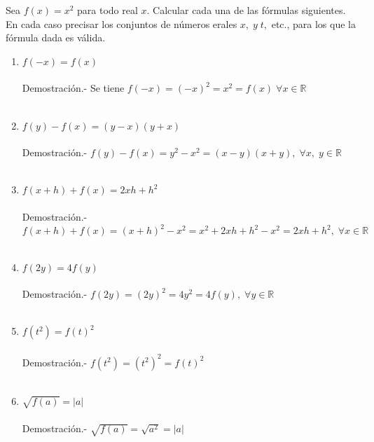 \begin{ej}
Sea $f(x)=x^2$  para todo real $x$. Calcular cada una de las fórmulas siguientes. En cada caso precisar los conjuntos de números erales $x, \; y \; t,$ etc., para los que la fórmula dada es válida.
\begin{enumerate}[\bfseries a)]
\item $f(-x)=f(x)$ \\\\
Demostración.- \; Se tiene $f(-x) = (-x)^2 = x^2 = f(x) \; \forall x \in \mathbb{R}$\\\\

\item $f(y)-f(x)=(y-x)(y+x)$\\\\
Demostración.- \; $f(y)-f(x)= y^2 - x^2 = (x-y)(x+y), \; \forall x, \; y \in \mathbb{R}$\\\\

\item $f(x+h) + f(x) = 2xh + h^2$\\\\
Demostración.- \; $f(x+h) + f(x) = (x+h)^2 -x^2 = x^2 + 2xh +h^2 - x^2 = 2xh + h^2, \; \forall x \in \mathbb{R}$\\\\

\item $f(2y) = 4f(y)$\\\\
Demostración.- \; $f(2y) = (2y)^2 = 4y^2 = 4 f(y), \; \forall y \in \mathbb{R}$\\\\

\item $f(t^2)=f(t)^2$\\\\
Demostración.- \; $f(t^2) = (t^2)^2 = f(t)^2$\\\\

\item $\sqrt{f(a)} = |a|$\\\\
Demostración.- \; $\sqrt{f(a)} = \sqrt{a^2} = |a|$\\\\
\end{enumerate}
\end{ej}

